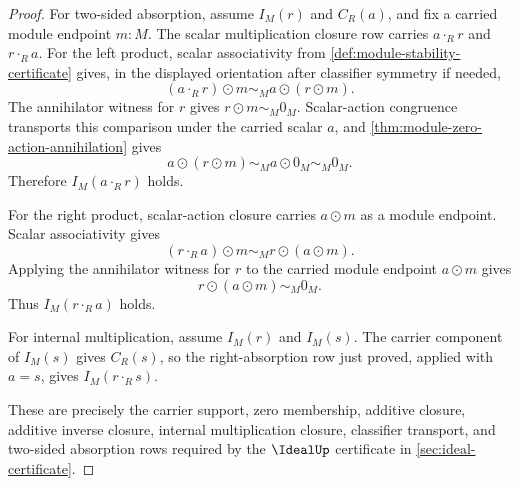 \begin{proof}
For two-sided absorption, assume $I_M(r)$ and $C_R(a)$, and fix a carried module endpoint $m:M$. The scalar multiplication closure row carries $a\cdot_R r$ and $r\cdot_R a$. For the left product, scalar associativity from \autoref{def:module-stability-certificate} gives, in the displayed orientation after classifier symmetry if needed,
$$
(a\cdot_R r)\odot m\sim_Ma\odot(r\odot m).
$$
The annihilator witness for $r$ gives $r\odot m\sim_M0_M$. Scalar-action congruence transports this comparison under the carried scalar $a$, and \autoref{thm:module-zero-action-annihilation} gives
$$
a\odot(r\odot m)\sim_Ma\odot0_M\sim_M0_M.
$$
Therefore $I_M(a\cdot_R r)$ holds.

For the right product, scalar-action closure carries $a\odot m$ as a module endpoint. Scalar associativity gives
$$
(r\cdot_R a)\odot m\sim_Mr\odot(a\odot m).
$$
Applying the annihilator witness for $r$ to the carried module endpoint $a\odot m$ gives
$$
r\odot(a\odot m)\sim_M0_M.
$$
Thus $I_M(r\cdot_R a)$ holds.

For internal multiplication, assume $I_M(r)$ and $I_M(s)$. The carrier component of $I_M(s)$ gives $C_R(s)$, so the right-absorption row just proved, applied with $a=s$, gives $I_M(r\cdot_R s)$.

These are precisely the carrier support, zero membership, additive closure, additive inverse closure, internal multiplication closure, classifier transport, and two-sided absorption rows required by the $\IdealUp$ certificate in \autoref{sec:ideal-certificate}.
\end{proof}
